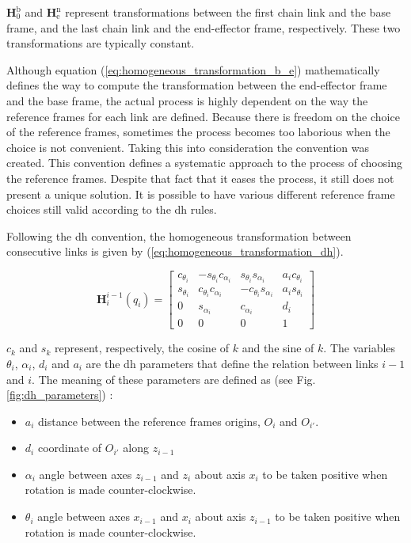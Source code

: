 $\boldsymbol{H}^{\text{b}}_{\text{0}}$ and $\boldsymbol{H}^{\text{n}}_{\text{e}}$ represent transformations between the first chain link and the base frame, and the last chain link and the end-effector frame, respectively. These two transformations are typically constant.

Although equation (\ref{eq:homogeneous_transformation_b_e}) mathematically defines the way to compute the transformation between the end-effector frame and the base frame, the actual process is highly dependent on the way the reference frames for each link are defined. Because there is freedom on the choice of the reference frames, sometimes the process becomes too laborious when the choice is not convenient. Taking this into consideration the  convention was created. This convention defines a systematic approach to the process of choosing the reference frames. Despite that fact that it eases the process, it still does not present a unique solution. It is possible to have various different reference frame choices still valid according to the \gls{dh} rules.

Following the \gls{dh} convention, the homogeneous transformation between consecutive links is given by (\ref{eq:homogeneous_transformation_dh}).

\begin{equation}
    \label{eq:homogeneous_transformation_dh}
    \boldsymbol{H}^{i-1}_{i}(q_i) = \begin{bmatrix}
        c_{\theta_i} & -s_{\theta_i}c_{\alpha_i} & s_{\theta_i}s_{\alpha_i} & a_{i}c_{\theta_i}\\
        s_{\theta_i} & c_{\theta_i}c_{\alpha_i} & -c_{\theta_i}s_{\alpha_i} & a_{i}s_{\theta_i}\\
        0 & s_{\alpha_i} & c_{\alpha_i} & d_{i}\\
        0 & 0 & 0 & 1
    \end{bmatrix}
\end{equation}

$c_k$ and $s_k$ represent, respectively, the cosine of $k$ and the sine of $k$. The variables $\theta_i$, $\alpha_i$, $d_i$ and $a_i$ are the \gls{dh} parameters that define the relation between links $i-1$ and $i$. The meaning of these parameters are defined as (see Fig. \ref{fig:dh_parameters}) \cite{Siciliano2009_robotics_modelling_planning_control}:

\begin{itemize}
    \item $a_i$ distance between the reference frames origins, $O_i$ and $O_{i'}$.
    \item $d_i$ coordinate of $O_{i'}$ along $z_{i-1}$
    \item $\alpha_i$ angle between axes $z_{i-1}$ and $z_i$ about axis $x_i$ to be taken positive when rotation is made counter-clockwise.
    \item $\theta_i$ angle between axes $x_{i-1}$ and $x_i$ about axis $z_{i-1}$ to be taken positive when rotation is made counter-clockwise.
\end{itemize}

